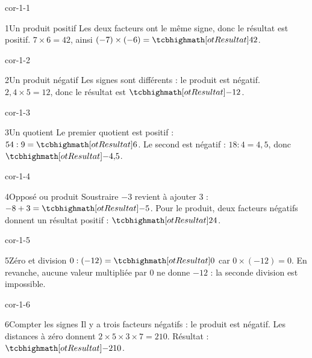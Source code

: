 \clearpage\pagestyle{otMain}\setlength{\otBlocEspacement}{2.5mm}\fontsize{11}{15}\selectfont{}
\begin{blocLivre}{cor-1-1}\begin{corrige}{1}{Un produit positif}
Les deux facteurs ont le même signe, donc le résultat est positif. $7\times6=42$, ainsi $(-7)\times(-6)=\res{42}$.
\end{corrige}\end{blocLivre}
\begin{blocLivre}{cor-1-2}\begin{corrige}{2}{Un produit négatif}
Les signes sont différents : le produit est négatif. $2{,}4\times5=12$, donc le résultat est $\res{-12}$.
\end{corrige}\end{blocLivre}
\begin{blocLivre}{cor-1-3}\begin{corrige}{3}{Un quotient}
Le premier quotient est positif : $54:9=\res6$. Le second est négatif : $18:4=4{,}5$, donc $\res{-4{,}5}$.
\end{corrige}\end{blocLivre}
\begin{blocLivre}{cor-1-4}\begin{corrige}{4}{Opposé ou produit}
Soustraire $-3$ revient à ajouter 3 : $-8+3=\res{-5}$. Pour le produit, deux facteurs négatifs donnent un résultat positif : $\res{24}$.
\end{corrige}\end{blocLivre}
\begin{blocLivre}{cor-1-5}\begin{corrige}{5}{Zéro et division}
$0:(-12)=\res0$ car $0\times(-12)=0$. En revanche, aucune valeur multipliée par 0 ne donne $-12$ : la seconde division est impossible.
\end{corrige}\end{blocLivre}
\begin{blocLivre}{cor-1-6}\begin{corrige}{6}{Compter les signes}
Il y a trois facteurs négatifs : le produit est négatif. Les distances à zéro donnent $2\times5\times3\times7=210$. Résultat : $\res{-210}$.
\end{corrige}\end{blocLivre}
